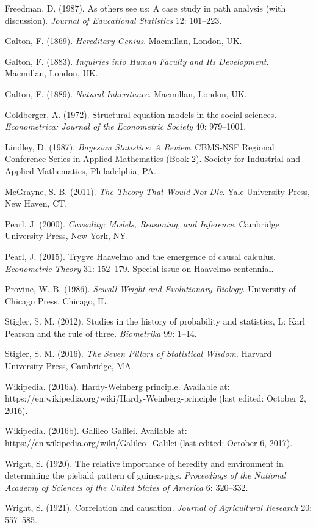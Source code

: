 \documentclass[11pt,a5paper,twoside]{book}
\begin{document}
Freedman, D. (1987). As others see us: A case study in path analysis (with discussion). \textit{Journal of Educational Statistics} 12: 101–223.

Galton, F. (1869). \textit{Hereditary Genius}. Macmillan, London, UK.

Galton, F. (1883). \textit{Inquiries into Human Faculty and Its Development}. Macmillan, London, UK.

Galton, F. (1889). \textit{Natural Inheritance}. Macmillan, London, UK.

Goldberger, A. (1972). Structural equation models in the social sciences. \textit{Econometrica: Journal of the Econometric Society} 40: 979–1001.

Lindley, D. (1987). \textit{Bayesian Statistics: A Review}. CBMS-NSF Regional Conference Series in Applied Mathematics (Book 2). Society for Industrial and Applied Mathematics, Philadelphia, PA.

McGrayne, S. B. (2011). \textit{The Theory That Would Not Die}. Yale University Press, New Haven, CT.

Pearl, J. (2000). \textit{Causality: Models, Reasoning, and Inference}. Cambridge University Press, New York, NY.

Pearl, J. (2015). Trygve Haavelmo and the emergence of causal calculus. \textit{Econometric Theory} 31: 152–179. Special issue on Haavelmo centennial.

Provine, W. B. (1986). \textit{Sewall Wright and Evolutionary Biology}. University of Chicago Press, Chicago, IL.

Stigler, S. M. (2012). Studies in the history of probability and statistics, L: Karl Pearson and the rule of three. \textit{Biometrika} 99: 1–14.

Stigler, S. M. (2016). \textit{The Seven Pillars of Statistical Wisdom}. Harvard University Press, Cambridge, MA.

Wikipedia. (2016a). Hardy-Weinberg principle. Available at: https://en.wikipedia.org/wiki/Hardy-Weinberg-principle (last edited: October 2, 2016).

Wikipedia. (2016b). Galileo Galilei. Available at: https://en.wikipedia.org/wiki/Galileo\_Galilei (last edited: October 6, 2017).

Wright, S. (1920). The relative importance of heredity and environment in determining the piebald pattern of guinea-pigs. \textit{Proceedings of the National Academy of Sciences of the United States of America} 6: 320–332.

Wright, S. (1921). Correlation and causation. \textit{Journal of Agricultural Research} 20: 557–585.
\end{document}
